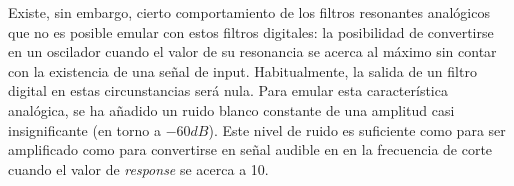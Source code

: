 Existe, sin embargo, cierto comportamiento de los filtros resonantes analógicos que no es posible emular con estos filtros digitales: la posibilidad de convertirse en un oscilador cuando el valor de su resonancia se acerca al máximo sin contar con la existencia de una señal de input. Habitualmente, la salida de un filtro digital en estas circunstancias será nula. Para emular esta característica analógica, se ha añadido un ruido blanco constante de una amplitud casi insignificante (en torno a $-60 dB$). Este nivel de ruido es suficiente como para ser amplificado como para convertirse en señal audible en en la frecuencia de corte cuando el valor de \textit{response} se acerca a 10.






